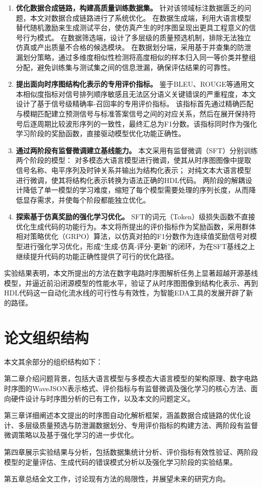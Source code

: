 \begin{enumerate}
  \item \textbf{优化数据合成链路，构建高质量训练数据集。}
  针对该领域标注数据匮乏的问题，本文对数据合成链路进行了系统优化。
  在数据生成端，利用大语言模型替代随机激励来生成测试平台，使仿真产生的时序图呈现出更具工程意义的信号行为模式。
  在数据筛选端，设计了多层级的质量预选机制，排除无法独立仿真或产出质量不合格的候选模块。
  在数据划分端，采用基于并查集的防泄漏划分策略，通过多维度相似性检测将高度相似的样本归入同一等价类并整组分配，避免训练集与测试集之间的信息泄漏，确保评估结果的可靠性。

  \item \textbf{提出面向时序图结构化表示的专用评价指标。}
  鉴于BLEU、ROUGE等通用文本相似度指标对信号排列顺序敏感且无法区分语义关键错误的严重程度，本文设计了基于信号级精确率-召回率的专用评价指标。
  该指标首先通过精确匹配与模糊匹配建立预测信号与标准答案信号之间的对应关系，然后在展开保持符号后逐周期比较波形序列的一致性，最终汇总为F1分数。该指标同时作为强化学习阶段的奖励函数，直接驱动模型优化功能正确性。

  \item \textbf{通过两阶段有监督微调建立基线能力。}
  本文采用有监督微调（SFT）分别训练两个阶段的模型：
  对多模态大语言模型进行微调，使其从时序图图像中提取信号名称、电平序列及时钟关系并输出为结构化表示；
  对纯文本大语言模型进行微调，使其将结构化表示转换为语法正确的HDL代码。
  两阶段的解耦设计降低了单一模型的学习难度，缩短了每个模型需要处理的序列长度，从而降低显存需求，并使每个阶段都能独立优化。

  \item \textbf{探索基于仿真奖励的强化学习优化。}
  SFT的词元（Token）级损失函数不直接优化生成代码的功能行为。本文将所提出的评价指标作为奖励函数，采用群体相对策略优化（GRPO）算法，以仿真对拍的F1分数作为连续值奖励信号对模型进行强化学习优化，形成“生成-仿真-评分-更新”的闭环，为在SFT基线之上继续提升代码的功能正确性提供了可行的优化路径。
\end{enumerate}

实验结果表明，本文所提出的方法在数字电路时序图解析任务上显著超越开源基线模型，并逼近前沿闭源模型的性能水平，验证了从时序图图像到结构化表示、再到HDL代码这一自动化流水线的可行性与有效性，为智能EDA工具的发展开辟了新的路径。


\section{论文组织结构}

本文其余部分的组织结构如下：

第二章介绍问题背景，包括大语言模型与多模态大语言模型的架构原理、数字电路时序图的WaveJSON表示格式、评价指标与有监督微调及强化学习的核心方法、面向硬件设计与时序图分析的已有工作，以及本文的问题定义。

第三章详细阐述本文提出的时序图自动化解析框架，涵盖数据合成链路的优化设计、多层级质量预选与防泄漏数据划分、专用评价指标的构建方法、两阶段有监督微调策略以及基于强化学习的进一步优化。

第四章展示实验结果与分析，包括数据集统计分析、评价指标有效性验证、两阶段模型的定量评估、生成代码的错误模式分析以及强化学习阶段的实验结果。

第五章总结全文工作，讨论现有方法的局限性，并展望未来的研究方向。
